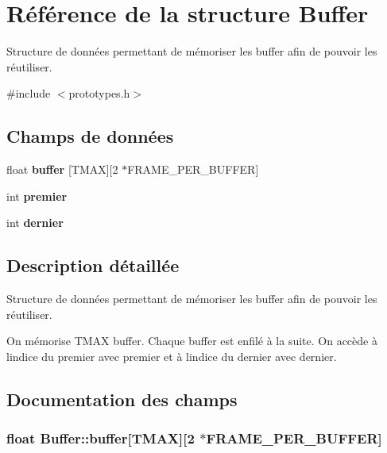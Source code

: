 \hypertarget{structBuffer}{}\section{Référence de la structure Buffer}
\label{structBuffer}


Structure de données permettant de mémoriser les buffer afin de pouvoir les réutiliser.  




{\ttfamily \#include $<$prototypes.\+h$>$}

\subsection*{Champs de données}
\begin{DoxyCompactItemize}
\item 
float {\bfseries buffer} \mbox{[}T\+M\+AX\mbox{]}\mbox{[}2 $\ast$F\+R\+A\+M\+E\+\_\+\+P\+E\+R\+\_\+\+B\+U\+F\+F\+ER\mbox{]}\hypertarget{structBuffer_ae73ea083f949aa524632e4d6561ad35c}{}\label{structBuffer_ae73ea083f949aa524632e4d6561ad35c}

\item 
int {\bfseries premier}\hypertarget{structBuffer_a602dbfdc9aa40beec34f827f0a96a18a}{}\label{structBuffer_a602dbfdc9aa40beec34f827f0a96a18a}

\item 
int {\bfseries dernier}\hypertarget{structBuffer_a837b38f7ae7ac04da3a2cbe9a335aa03}{}\label{structBuffer_a837b38f7ae7ac04da3a2cbe9a335aa03}

\end{DoxyCompactItemize}


\subsection{Description détaillée}
Structure de données permettant de mémoriser les buffer afin de pouvoir les réutiliser. 

On mémorise T\+M\+AX buffer. Chaque buffer est enfilé à la suite. On accède à l\textquotesingle{}indice du premier avec premier et à l\textquotesingle{}indice du dernier avec dernier. 

\subsection{Documentation des champs}
\subsubsection[{\texorpdfstring{buffer}{buffer}}]{\setlength{\rightskip}{0pt plus 5cm}float Buffer\+::buffer\mbox{[}T\+M\+AX\mbox{]}\mbox{[}2 $\ast$F\+R\+A\+M\+E\+\_\+\+P\+E\+R\+\_\+\+B\+U\+F\+F\+ER\mbox{]}}\hypertarget{structBuffer_ae73ea083f949aa524632e4d6561ad35c}{}\label{structBuffer_ae73ea083f949aa524632e4d6561ad35c}
